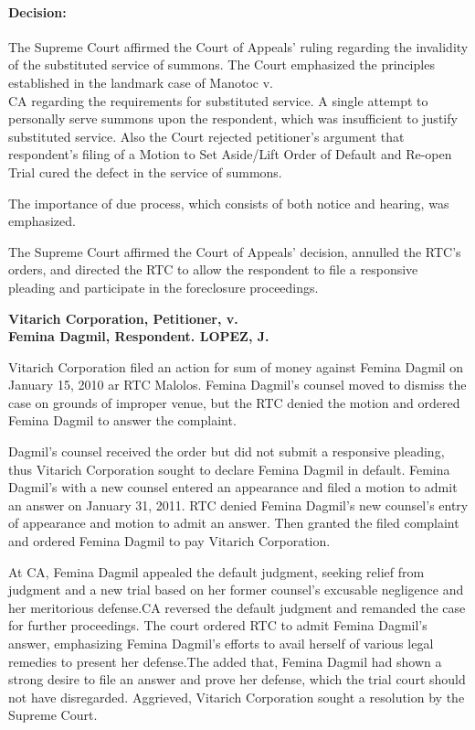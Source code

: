 \documentclass[
12pt,
oneside,
onehalfspacing,
headsepline
]{DigestCollection}
\begin{document}
\paragraph{Decision:}

The Supreme Court affirmed the Court of Appeals' ruling regarding the invalidity of the substituted service of summons. The Court emphasized the principles established in the landmark case of Manotoc v. \\CA regarding the requirements for substituted service. A single attempt to personally serve summons upon the respondent, which was insufficient to justify substituted service. Also the Court rejected petitioner's argument that respondent's filing of a Motion to Set Aside/Lift Order of Default and Re-open Trial cured the defect in the service of summons.

The importance of due process, which consists of both notice and hearing, was emphasized.

The Supreme Court affirmed the Court of Appeals' decision, annulled the RTC's orders, and directed the RTC to allow the respondent to file a responsive pleading and participate in the foreclosure proceedings.


\noindent\textbf{Vitarich Corporation, Petitioner, v. \\Femina Dagmil, Respondent. LOPEZ, J.}\vspace{0.4cm}

Vitarich Corporation filed an action for sum of money against Femina Dagmil on January 15, 2010 ar RTC Malolos. Femina Dagmil's counsel moved to dismiss the case on grounds of improper venue, but the RTC denied the motion and ordered Femina Dagmil to answer the complaint.

Dagmil's counsel received the order but did not submit a responsive pleading, thus Vitarich Corporation sought to declare Femina Dagmil in default. Femina Dagmil's with a new counsel entered an appearance and filed a motion to admit an answer on January 31, 2011. RTC denied Femina Dagmil's new counsel's entry of appearance and motion to admit an answer. Then granted the filed complaint and ordered Femina Dagmil to pay Vitarich Corporation.

At CA, Femina Dagmil appealed the default judgment, seeking relief from judgment and a new trial based on her former counsel's excusable negligence and her meritorious defense.CA reversed the default judgment and remanded the case for further proceedings. The court ordered RTC to admit Femina Dagmil's answer, emphasizing Femina Dagmil's efforts to avail herself of various legal remedies to present her defense.The added that, Femina Dagmil had shown a strong desire to file an answer and prove her defense, which the trial court should not have disregarded. Aggrieved, Vitarich Corporation sought a resolution by the Supreme Court.
\end{document}
